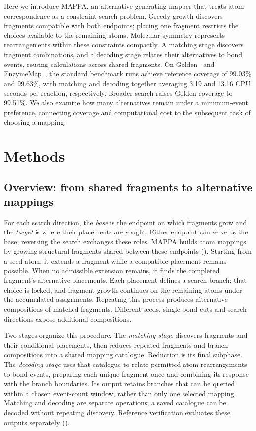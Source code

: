 Here we introduce MAPPA, an alternative-generating mapper that treats atom correspondence as a constraint-search problem. Greedy growth discovers fragments compatible with both endpoints; placing one fragment restricts the choices available to the remaining atoms. Molecular symmetry represents rearrangements within these constraints compactly. A matching stage discovers fragment combinations, and a decoding stage relates their alternatives to bond events, reusing calculations across shared fragments. On Golden~\citep{lin2022} and EnzymeMap~\citep{heid2023enzymemap}, the standard benchmark runs achieve reference coverage of 99.03\% and 99.63\%, with matching and decoding together averaging 3.19 and 13.16 CPU seconds per reaction, respectively. Broader search raises Golden coverage to 99.51\%. We also examine how many alternatives remain under a minimum-event preference, connecting coverage and computational cost to the subsequent task of choosing a mapping.

\section{Methods}

\subsection{Overview: from shared fragments to alternative mappings}
\label{sec:architecture}
\label{sec:design-principle}

For each search direction, the \emph{base} is the endpoint on which fragments grow and the \emph{target} is where their placements are sought. Either endpoint can serve as the base; reversing the search exchanges these roles. MAPPA builds atom mappings by growing structural fragments shared between these endpoints (). Starting from a seed atom, it extends a fragment while a compatible placement remains possible. When no admissible extension remains, it finds the completed fragment's alternative placements. Each placement defines a search branch: that choice is locked, and fragment growth continues on the remaining atoms under the accumulated assignments. Repeating this process produces alternative compositions of matched fragments. Different seeds, single-bond cuts and search directions expose additional compositions.

Two stages organize this procedure. The \emph{matching stage} discovers fragments and their conditional placements, then reduces repeated fragments and branch compositions into a shared mapping catalogue. Reduction is its final subphase. The \emph{decoding stage} uses that catalogue to relate permitted atom rearrangements to bond events, preparing each unique fragment once and combining its response with the branch boundaries. Its output retains branches that can be queried within a chosen event-count window, rather than only one selected mapping. Matching and decoding are separate operations; a saved catalogue can be decoded without repeating discovery. Reference verification evaluates these outputs separately ().

